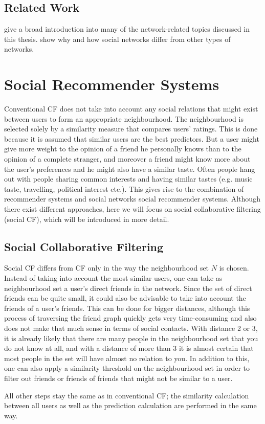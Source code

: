 \subsection{Related Work}
\label{sst:snrelatedwork} \cite{Easley_2010} give a broad introduction into many of the network-related topics discussed in this thesis. \cite{Newman_2003} show why and how social networks differ from other types of networks.

\section{Social Recommender Systems}
\label{st:socialrecommendersystems} Conventional CF does not take into account any social relations that might exist between users to form an appropriate neighbourhood. The neighbourhood is selected solely by a similarity measure that compares users' ratings. This is done because it is assumed that similar users are the best predictors. But a user might give more weight to the opinion of a friend he personally knows than to the opinion of a complete stranger, and moreover a friend might know more about the user's preferences and he might also have a similar taste. Often people hang out with people sharing common interests and having similar tastes (e.g. music taste, travelling, political interest etc.). This gives rise to the combination of recommender systems and social networks \textendash social recommender systems. Although there exist different approaches, here we will focus on social collaborative filtering (social CF), which will be introduced in more detail.

\subsection{Social Collaborative Filtering}
\label{sst:socialcf} Social CF differs from CF only in the way the neighbourhood set $N$ is chosen. Instead of taking into account the most similar users, one can take as neighbourhood set a user's direct friends in the network. Since the set of direct friends can be quite small, it could also be advisable to take into account the friends of a user's friends. This can be done for bigger distances, although this process of traversing the friend graph quickly gets very time-consuming and also does not make that much sense in terms of social contacts. With distance 2 or 3, it is already likely that there are many people in the neighbourhood set that you do not know at all, and with a distance of more than 3 it is almost certain that most people in the set will have almost no relation to you. In addition to this, one can also apply a similarity threshold on the neighbourhood set in order to filter out friends or friends of friends that might not be similar to a user.

All other steps stay the same as in conventional CF; the similarity calculation between all users as well as the prediction calculation are performed in the same way.